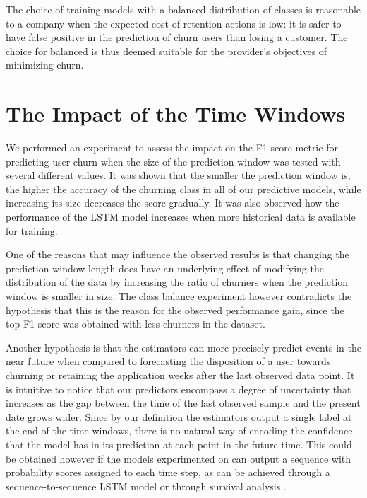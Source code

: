 \documentclass{kththesis}
\begin{document}
The choice of training models with a balanced distribution of classes is reasonable to a company when the expected cost of retention actions is low: it is safer to have false positive in the prediction of churn users than losing a customer. The choice for balanced is thus deemed suitable for the provider's objectives of minimizing churn. 

\section{The Impact of the Time Windows}
\label{sec:dis_time_windows}

We performed an experiment to assess the impact on the F1-score metric for predicting user churn when the size of the prediction window was tested with several different values. It was shown that the smaller the prediction window is, the higher the accuracy of the churning class in all of our predictive models, while increasing its size decreases the score gradually. It was also observed how the performance of the LSTM model increases when more historical data is available for training.

One of the reasons that may influence the observed results is that changing the prediction window length does have an underlying effect of modifying the distribution of the data by increasing the ratio of churners when the prediction window is smaller in size. The class balance experiment however contradicts the hypothesis that this is the reason for the observed performance gain, since the top F1-score was obtained with less churners in the dataset.

Another hypothesis is that the estimators can more precisely predict events in the near future when compared to forecasting the disposition of a user towards churning or retaining the application weeks after the last observed data point. It is intuitive to notice that our predictors encompass a degree of uncertainty that increases as the gap between the time of the last observed sample and the present date grows wider. Since by our definition the estimators output a single label at the end of the time windows, there is no natural way of encoding the confidence that the model has in its prediction at each point in the future time. This could be obtained however if the models experimented on can output a sequence with probability scores assigned to each time step, as can be achieved through a sequence-to-sequence LSTM \citep{cho2014learning} model or through survival analysis \citep{ibrahim2005bayesian}.
\end{document}

